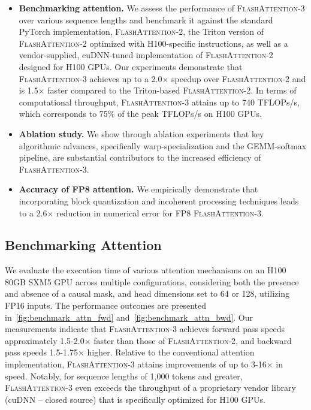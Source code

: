 \begin{itemize}

\item \textbf{Benchmarking attention.} We assess the performance of \textsc{FlashAttention-3} over various sequence lengths and benchmark it against the standard PyTorch implementation, \textsc{FlashAttention-2}, the Triton version of \textsc{FlashAttention-2} optimized with H100-specific instructions, as well as a vendor-supplied, cuDNN-tuned implementation of \textsc{FlashAttention-2} designed for H100 GPUs. Our experiments demonstrate that \textsc{FlashAttention-3} achieves up to a 2.0$\times$ speedup over \textsc{FlashAttention-2} and is 1.5$\times$ faster compared to the Triton-based \textsc{FlashAttention-2}. In terms of computational throughput, \textsc{FlashAttention-3} attains up to 740 TFLOPs/s, which corresponds to 75\% of the peak TFLOPs/s on H100 GPUs.
\item \textbf{Ablation study.} We show through ablation experiments that key algorithmic advances, specifically warp-specialization and the GEMM-softmax pipeline, are substantial contributors to the increased efficiency of \textsc{FlashAttention-3}.
\item \textbf{Accuracy of FP8 attention.} We empirically demonstrate that incorporating block quantization and incoherent processing techniques leads to a 2.6$\times$ reduction in numerical error for FP8 \textsc{FlashAttention-3}.
\end{itemize}

\subsection{Benchmarking Attention}
\label{subsec:benchmark_attn}

We evaluate the execution time of various attention mechanisms on an H100 80GB SXM5 GPU across multiple configurations, considering both the presence and absence of a causal mask, and head dimensions set to 64 or 128, utilizing FP16 inputs. The performance outcomes are presented in~\cref{fig:benchmark_attn_fwd} and~\cref{fig:benchmark_attn_bwd}. Our measurements indicate that \textsc{FlashAttention-3} achieves forward pass speeds approximately 1.5-2.0$\times$ faster than those of \textsc{FlashAttention-2}, and backward pass speeds 1.5-1.75$\times$ higher. Relative to the conventional attention implementation, \textsc{FlashAttention-3} attains improvements of up to 3-16$\times$ in speed. Notably, for sequence lengths of 1,000 tokens and greater, \textsc{FlashAttention-3} even exceeds the throughput of a proprietary vendor library (cuDNN -- closed source) that is specifically optimized for H100 GPUs.

